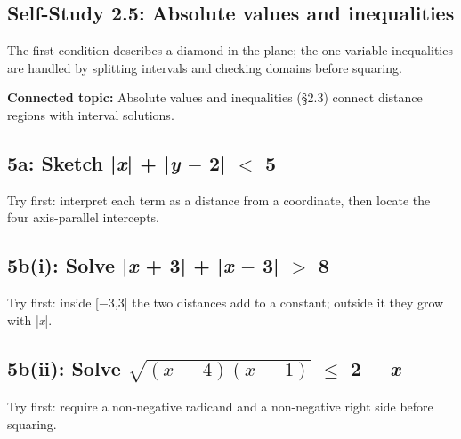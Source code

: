 \documentclass[11pt]{article}
\begin{document}
\begin{keepsection}
\section{Self-Study 2.5: Absolute values and inequalities}

The first condition describes a diamond in the plane; the one-variable inequalities are handled by splitting intervals and checking domains before squaring.

\textbf{Connected topic:} Absolute values and inequalities (§2.3) connect distance regions with interval solutions.

\begin{keepsection}
\subsection{5a: Sketch |\textit{x}| + |\textit{y} \ensuremath{-} 2| \ensuremath{<} 5}

Try first: interpret each term as a distance from a coordinate, then locate the four axis-parallel intercepts.

\end{keepsection}

\begin{keepsection}
\subsection{5b(i): Solve |\textit{x} + 3| + |\textit{x} \ensuremath{-} 3| \ensuremath{>} 8}

Try first: inside [\ensuremath{-}3,3] the two distances add to a constant; outside it they grow with |\textit{x}|.

\end{keepsection}

\begin{keepsection}
\subsection{5b(ii): Solve \ensuremath{\sqrt{({x}\, -\, 4)({x}\, -\, 1)}} \ensuremath{\leq} 2 \ensuremath{-} \textit{x}}

Try first: require a non-negative radicand and a non-negative right side before squaring.

\end{keepsection}
\end{keepsection}
\end{document}
